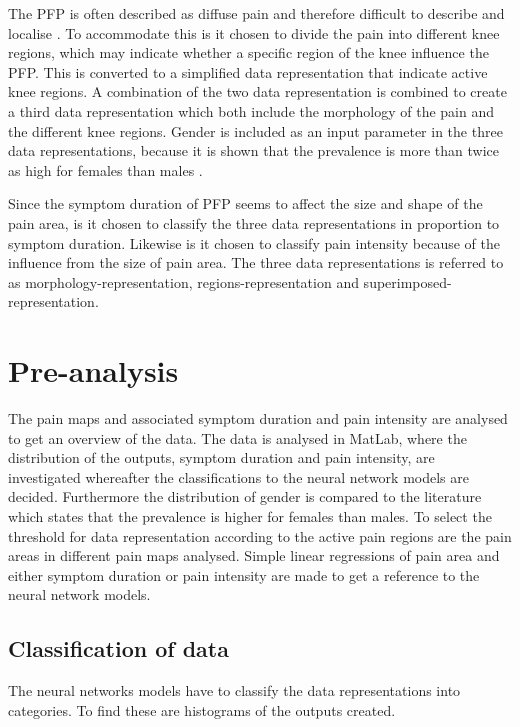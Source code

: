 \noindent
The PFP is often described as diffuse pain and therefore difficult to describe and localise \citep{Witvrouw2014}. To accommodate this is it chosen to divide the pain into different knee regions, which may indicate whether a specific region of the knee influence the PFP. This is converted to a simplified data representation that indicate active knee regions. 
A combination of the two data representation is combined to create a third data representation which both include the morphology of the pain and the different knee regions. 
Gender is included as an input parameter in the three data representations, because it is shown that the prevalence is more than twice as high for females than males \citep{Petersen2013, Rathleff2015}.  

\noindent
Since the symptom duration of PFP seems to affect the size and shape of the pain area, is it chosen to classify the three data representations in proportion to symptom duration. Likewise is it chosen to classify pain intensity because of the influence from the size of pain area.
The three data representations is referred to as morphology-representation, regions-representation and superimposed-representation.


\section{Pre-analysis}
The pain maps and associated symptom duration and pain intensity are analysed to get an overview of the data. The data is analysed in MatLab, where the distribution of the outputs, symptom duration and pain intensity, are investigated whereafter the classifications to the neural network models are decided. Furthermore the distribution of gender is compared to the literature which states that the prevalence is higher for females than males.
To select the threshold for data representation according to the active pain regions are the pain areas in different pain maps analysed. 
Simple linear regressions of pain area and either symptom duration or pain intensity are made to get a reference to the neural network models. 

\subsection{Classification of data}
The neural networks models have to classify the data representations into categories. To find these are histograms of the outputs created. \\

